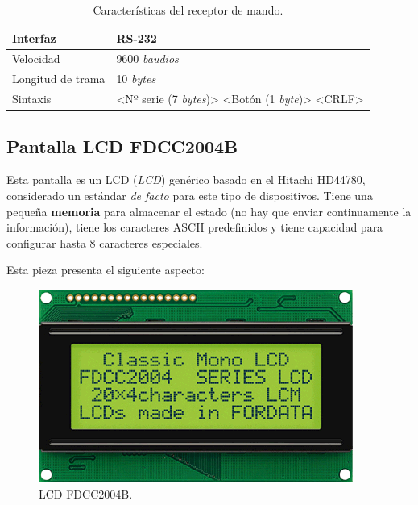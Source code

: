 \smallskip

\begin{table}[H]
	\begin{center}
		\begin{tabular}{|l|l|}
			\hline Interfaz & RS-232 \\
			\hline Velocidad & 9600 \textit{baudios} \\ 
			\hline Longitud de trama & 10 \textit{bytes} \\ 
			\hline Sintaxis & <Nº serie (7 \textit{bytes})> <Botón (1 \textit{byte})> <CRLF> \\ 
			\hline 
		\end{tabular}
		\smallskip
		\caption[Características del receptor de mando.]{\label{tab:info_recv} Características del receptor de mando. \cite{datasheet_decoder}}
	\end{center}
\end{table}
\smallskip

\subsection{Pantalla LCD FDCC2004B}

Esta pantalla es un \acrshort{LCD} (\textit{\acrlong{LCD}}) genérico basado en el Hitachi HD44780, considerado un estándar \textit{de facto} para este tipo de dispositivos. Tiene una pequeña \textbf{memoria} para almacenar el estado (no hay que enviar continuamente la información), tiene los caracteres \acrshort{ASCII} predefinidos y tiene capacidad para configurar hasta 8 caracteres especiales.

Esta pieza presenta el siguiente aspecto:

\smallskip

\begin{figure}[H]
	\noindent \begin{centering}
		\includegraphics[width=\linewidth/2]{capitulo3/FDCC2004B}
		\par\end{centering}
	\smallskip
	\caption{\label{fig:FDCC2004B} LCD FDCC2004B.}
\end{figure} 

